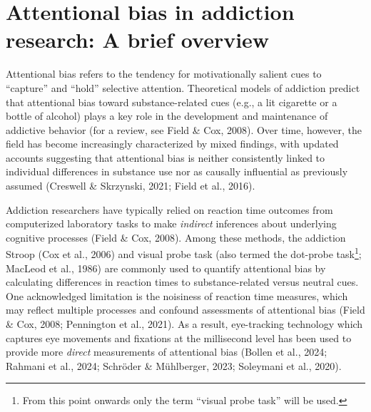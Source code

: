 \documentclass[authordate, empirical]{jote-new-article}
\author[1]{\mbox{Amber Copeland\orcid{0000-0003-4634-3343}}}
\affil[1]{University of Sheffield}
\begin{document}
\begin{frontmatter}
  \maketitle
  \begin{abstract}
    \printabstracttext
  \end{abstract}
\end{frontmatter}



	\section{Attentional bias in addiction research: A brief overview}



	Attentional bias refers to the tendency for motivationally salient cues to “capture” and “hold”\emph{ }selective attention. Theoretical models of addiction predict that attentional bias toward substance-related cues (e.g., a lit cigarette or a bottle of alcohol) plays a key role in the development and maintenance of addictive behavior (for a review, see Field \& Cox, 2008). Over time, however, the field has become increasingly characterized by mixed findings, with updated accounts suggesting that attentional bias is neither consistently linked to individual differences in substance use nor as causally influential as previously assumed (Creswell \& Skrzynski, 2021; Field et al., 2016).



	Addiction researchers have typically relied on reaction time outcomes from computerized laboratory tasks to make \emph{indirect} inferences about underlying cognitive processes (Field \& Cox, 2008). Among these methods, the addiction Stroop (Cox et al., 2006) and visual probe task (also termed the dot-probe task\footnote{ From this point onwards only the term “visual probe task” will be used.}; MacLeod et al., 1986) are commonly used to quantify attentional bias by calculating differences in reaction times to substance-related versus neutral cues. One acknowledged limitation is the noisiness of reaction time measures, which may reflect multiple processes and confound assessments of attentional bias (Field \& Cox, 2008; Pennington et al., 2021). As a result, eye-tracking technology which captures eye movements and fixations at the millisecond level has been used to provide more \emph{direct }measurements of attentional bias (Bollen et al., 2024; Rahmani et al., 2024; Schröder \& Mühlberger, 2023; Soleymani et al., 2020).
\end{document}
